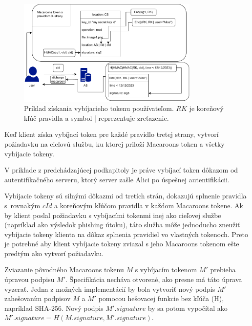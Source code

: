 \begin{figure}
    \centerline{\includegraphics[width=0.8\textwidth]{images/user_request}}
    \caption[Získanie vybíjacieho tokenu používateľom]{Príklad získania vybíjacieho tokenu používateľom. $RK$ je koreňový kľúč pravidla a symbol | reprezentuje zreťazenie.}
    \label{fig:user_request}
\end{figure}

Keď klient získa vybíjací token pre každé pravidlo tretej strany, vytvorí požiadavku na cieľovú službu, ku ktorej priloží Macaroons token a všetky vybíjacie tokeny.

V príklade z predchádzajúcej podkapitoly je práve vybíjací token dôkazom od autentifikačného serveru, ktorý server zašle Alici po úspešnej autentifikácii.

Vybíjacie tokeny sú silnými dôkazmi od tretích strán, dokazujú splnenie pravidla s~rovnakým $cId$ a koreňovým kľúčom pravidla v každom Macaroons tokene. Ak by klient poslal požiadavku s vybíjacími tokenmi inej ako cieľovej službe (napríklad ako výsledok phishing útoku), táto služba môže jednoducho zneužiť vybíjacie tokeny klienta na dôkaz splnenia pravidiel vo vlastných tokenoch. Preto je potrebné aby klient vybíjacie tokeny zviazal s jeho Macaroons tokenom ešte predtým ako vytvorí požiadavku.

Zviazanie pôvodného Macaroons tokenu $M$ s vybíjacím tokenom $M'$ prebieha úpravou podpisu $M'$. Špecifikácia necháva otvorené, ako presne má táto úprava vyzerať. Jedna z možných implementácií by bola vytvoriť nový podpis $M'$ zahešovaním podpisov $M$ a $M'$ pomocou hešovacej funkcie bez kľúča (H), napríklad SHA-256. Nový podpis $M'.signature$ by sa potom vypočítal ako $M'.signature = H(M.signature, M'.signature)$.


